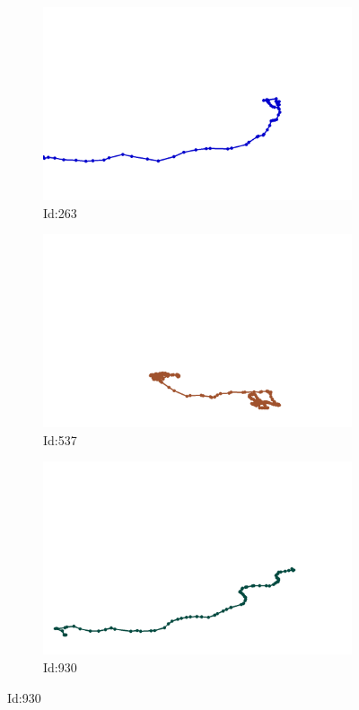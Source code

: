 \documentclass[12pt,twoside]{report}
\begin{document}
\begin{figure}
\centering
\begin{subfigure}[b]{0.20\textwidth}
\centering
\includegraphics[width=\textwidth]{../../trajectories/263.png}
\caption{Id:263}
\end{subfigure}
\begin{subfigure}[b]{0.20\textwidth}
\centering
\includegraphics[width=\textwidth]{../../trajectories/537.png}
\caption{Id:537}
\end{subfigure}
\begin{subfigure}[b]{0.20\textwidth}
\centering
\includegraphics[width=\textwidth]{../../trajectories/930.png}
\caption{Id:930}
\end{subfigure}
\end{figure}
\end{document}
